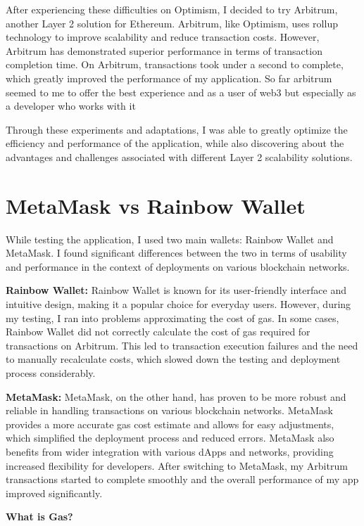 After experiencing these difficulties on Optimism, I decided to try Arbitrum, another Layer 2 solution for Ethereum. Arbitrum, like Optimism, uses rollup technology to improve scalability and reduce transaction costs. However, Arbitrum has demonstrated superior performance in terms of transaction completion time. On Arbitrum, transactions took under a second to complete, which greatly improved the performance of my application. So far arbitrum seemed to me to offer the best experience and as a user of web3 but especially as a developer who works with it 

Through these experiments and adaptations, I was able to greatly optimize the efficiency and performance of the application, while also discovering about the advantages and challenges associated with different Layer 2 scalability solutions.


\section{MetaMask vs Rainbow Wallet}
\label{sec:ch5sec2}

While testing the application, I used two main  wallets: Rainbow Wallet and MetaMask. I found significant differences between the two in terms of usability and performance in the context of deployments on various blockchain networks.

\textbf{Rainbow Wallet:}
Rainbow Wallet is known for its user-friendly interface and intuitive design, making it a popular choice for everyday users. However, during my testing, I ran into problems approximating the cost of gas. In some cases, Rainbow Wallet did not correctly calculate the cost of gas required for transactions on Arbitrum. This led to transaction execution failures and the need to manually recalculate costs, which slowed down the testing and deployment process considerably.

\textbf{MetaMask:}
MetaMask, on the other hand, has proven to be more robust and reliable in handling transactions on various blockchain networks. MetaMask provides a more accurate gas cost estimate and allows for easy adjustments, which simplified the deployment process and reduced errors. MetaMask also benefits from wider integration with various dApps and networks, providing increased flexibility for developers. After switching to MetaMask, my Arbitrum transactions started to complete smoothly and the overall performance of my app improved significantly.

\textbf{What is Gas?}

